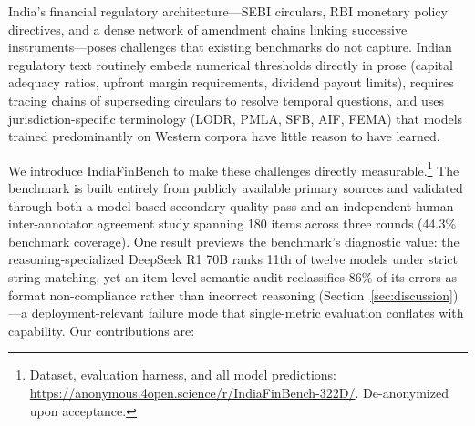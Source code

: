 \documentclass[11pt]{article}
\begin{document}
India's financial regulatory architecture---SEBI circulars, RBI monetary policy directives, and a dense network of amendment chains linking successive instruments---poses challenges that existing benchmarks do not capture. Indian regulatory text routinely embeds numerical thresholds directly in prose (capital adequacy ratios, upfront margin requirements, dividend payout limits), requires tracing chains of superseding circulars to resolve temporal questions, and uses jurisdiction-specific terminology (LODR, PMLA, SFB, AIF, FEMA) that models trained predominantly on Western corpora have little reason to have learned.

We introduce IndiaFinBench to make these challenges directly measurable.\footnote{Dataset, evaluation harness, and all model predictions: \url{https://anonymous.4open.science/r/IndiaFinBench-322D/}. De-anonymized upon acceptance.} The benchmark is built entirely from publicly available primary sources and validated through both a model-based secondary quality pass and an independent human inter-annotator agreement study spanning 180 items across three rounds (44.3\% benchmark coverage). One result previews the benchmark's diagnostic value: the reasoning-specialized DeepSeek R1 70B ranks 11th of twelve models under strict string-matching, yet an item-level semantic audit reclassifies 86\% of its errors as format non-compliance rather than incorrect reasoning (Section~\ref{sec:discussion})---a deployment-relevant failure mode that single-metric evaluation conflates with capability. Our contributions are:
\end{document}

